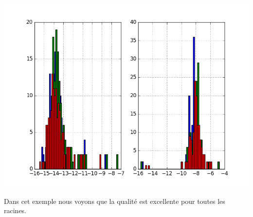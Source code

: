 \documentclass{standalone}
\begin{document}
   \begin{center}
  \includegraphics[height=10cm, width=18cm]{../png/ref1.png}
  \end{center}

  Dans cet exemple nous voyons que la qualité est excellente pour toutes les racines.
\end{document}

